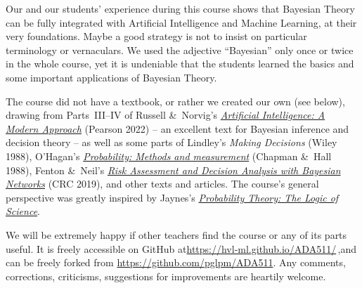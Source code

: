 Our and our students' experience during this course shows that Bayesian Theory can be fully integrated with Artificial Intelligence and Machine Learning, at their very foundations. Maybe a good strategy is not to insist on particular terminology or vernaculars. We used the adjective ``Bayesian'' only once or twice in the whole course, yet it is undeniable that the students learned the basics and some important applications of Bayesian Theory.

The course did not have a textbook, or rather we created our own (see below), drawing from Parts~III--IV of Russell \&\ Norvig's \href{http://aima.cs.berkeley.edu/global-index.html}{\emph{Artificial Intelligence: A Modern Approach}} (Pearson 2022) -- an excellent text for Bayesian inference and decision theory -- as well as some parts of Lindley's \emph{Making Decisions} (Wiley 1988), O'Hagan's \href{https://doi.org/10.1007/978-94-009-1211-3}{\emph{Probability: Methods and measurement}} (Chapman \&\ Hall 1988), Fenton \&\ Neil's \href{https://doi.org/10.1201/b21982}{\emph{Risk Assessment and Decision Analysis with Bayesian Networks}} (CRC 2019), and other texts and articles. The course's general perspective was greatly inspired by Jaynes's \href{https://doi.org/1017/CBO9780511790423}{\emph{Probability Theory: The Logic of Science}}.

\smallskip


We will be extremely happy if other teachers find the course or any of its parts useful. It is freely accessible on GitHub at\enspace \url{https://hvl-ml.github.io/ADA511/}\,,\enspace and can be freely forked from \url{https://github.com/pglpm/ADA511}. Any comments, corrections, criticisms, suggestions for improvements are heartily welcome.

